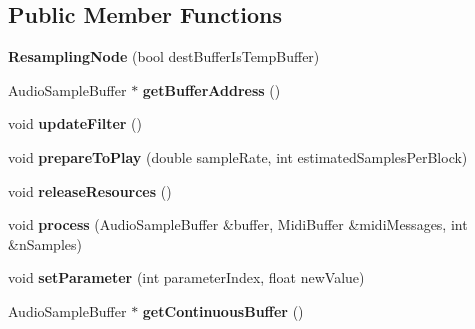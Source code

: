 \subsection*{Public Member Functions}
\begin{DoxyCompactItemize}
\item 
\hypertarget{classResamplingNode_acd5711ddad27cdd6155e53b180d5b387}{{\bfseries Resampling\-Node} (bool dest\-Buffer\-Is\-Temp\-Buffer)}\label{classResamplingNode_acd5711ddad27cdd6155e53b180d5b387}

\item 
\hypertarget{classResamplingNode_a02443ca9ed779e974ff222cfa0d4bbdd}{Audio\-Sample\-Buffer $\ast$ {\bfseries get\-Buffer\-Address} ()}\label{classResamplingNode_a02443ca9ed779e974ff222cfa0d4bbdd}

\item 
\hypertarget{classResamplingNode_afe65c4c590a9d2839982e3d9c1dbdbca}{void {\bfseries update\-Filter} ()}\label{classResamplingNode_afe65c4c590a9d2839982e3d9c1dbdbca}

\item 
\hypertarget{classResamplingNode_ad20396badb3000d315392d059846c803}{void {\bfseries prepare\-To\-Play} (double sample\-Rate, int estimated\-Samples\-Per\-Block)}\label{classResamplingNode_ad20396badb3000d315392d059846c803}

\item 
\hypertarget{classResamplingNode_af1298a6340299392d6e5503a29dca423}{void {\bfseries release\-Resources} ()}\label{classResamplingNode_af1298a6340299392d6e5503a29dca423}

\item 
\hypertarget{classResamplingNode_aad4c79707b095fa925c33ccaa208b576}{void {\bfseries process} (Audio\-Sample\-Buffer \&buffer, Midi\-Buffer \&midi\-Messages, int \&n\-Samples)}\label{classResamplingNode_aad4c79707b095fa925c33ccaa208b576}

\item 
\hypertarget{classResamplingNode_a52b642ff6993476725a1f38bfde2abff}{void {\bfseries set\-Parameter} (int parameter\-Index, float new\-Value)}\label{classResamplingNode_a52b642ff6993476725a1f38bfde2abff}

\item 
\hypertarget{classResamplingNode_a897e78c484e825a5809033d241a41d63}{Audio\-Sample\-Buffer $\ast$ {\bfseries get\-Continuous\-Buffer} ()}\label{classResamplingNode_a897e78c484e825a5809033d241a41d63}

\end{DoxyCompactItemize}
